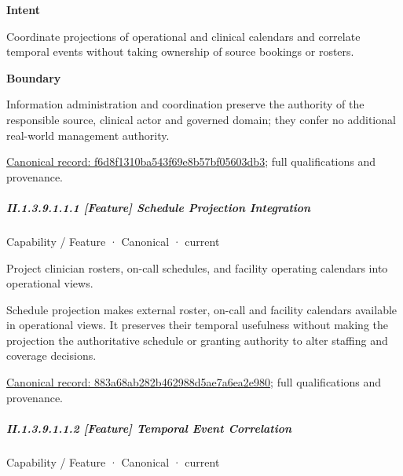 \textbf{Intent}



Coordinate projections of operational and clinical calendars and correlate temporal events without taking ownership of source bookings or rosters.



\textbf{Boundary}



Information administration and coordination preserve the authority of the responsible source, clinical actor and governed domain; they confer no additional real-world management authority.


{\footnotesize \href{../../../../continuum/strategy/capability/f6d8f1310ba543f69e8b57bf05603db3.md}{Canonical record: f6d8f1310ba543f69e8b57bf05603db3}; full qualifications and provenance.}\par
\subparagraph*{II.1.3.9.1.1.1 [Feature] Schedule Projection Integration}
\label{navigation:II.1.3.9.1.1.1}

\label{element:883a68ab282b462988d5ae7a6ea2e980}
{\small Capability / Feature · Canonical · current}\par

Project clinician rosters, on-call schedules, and facility operating calendars into operational views.



Schedule projection makes external roster, on-call and facility calendars available in operational views. It preserves their temporal usefulness without making the projection the authoritative schedule or granting authority to alter staffing and coverage decisions.


{\footnotesize \href{../../../../continuum/strategy/capability/feature/883a68ab282b462988d5ae7a6ea2e980.md}{Canonical record: 883a68ab282b462988d5ae7a6ea2e980}; full qualifications and provenance.}\par
\subparagraph*{II.1.3.9.1.1.2 [Feature] Temporal Event Correlation}
\label{navigation:II.1.3.9.1.1.2}

\label{element:05e1c23baf1c47fbac8457f991efa2be}
{\small Capability / Feature · Canonical · current}\par

